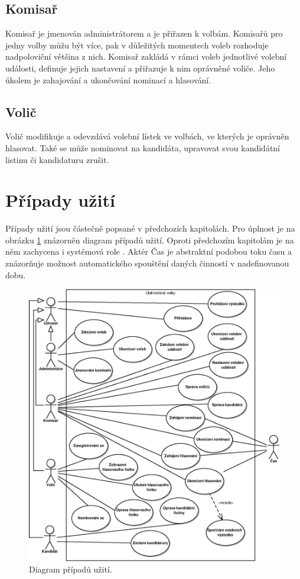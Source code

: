 \documentclass[11pt,twoside,a4paper]{book}
\begin{document}
\subsection{Komisař}

Komisař je jmenován administrátorem a je přiřazen k volbám. Komisařů pro jedny volby můžu být více, pak v důležitých momentech voleb rozhoduje nadpoloviční většina z nich. Komisař zakládá v rámci voleb jednotlivé volební události, definuje jejich nastavení a přiřazuje k nim oprávněné voliče. Jeho úkolem je zahajování a ukončování nominací a hlasování.

\subsection{Volič}

Volič modifikuje a odevzdává volební lístek ve volbách, ve kterých je oprávněn hlasovat. Také se může nominovat na kandidáta, upravovat svou kandidátní listinu či kandidaturu zrušit.

\section{Případy užití}

Případy užití jsou částečně popsané v předchozích kapitolách. Pro úplnost je na obrázku \ref{fig:pripady_uziti} znázorněn diagram případů užití. Oproti předchozím kapitolám je na něm zachycena i systémová role . Aktér Čas je abstraktní podobou toku času a znázorňuje možnost automatického spouštění daných činností v nadefinovanou dobu. 

\begin{figure}[h!]
	\centering
	\includegraphics[scale=0.9]{diagrams/pripady_uziti.eps}
	\caption{Diagram případů užití.}
	\label{fig:pripady_uziti}
\end{figure}
\end{document}
